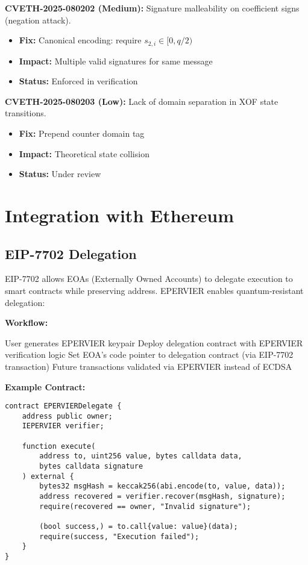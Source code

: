 \documentclass[11pt,a4paper]{article}
\begin{document}
\textbf{CVETH-2025-080202 (Medium):} Signature malleability on coefficient signs (negation attack).
\begin{itemize}
    \item \textbf{Fix:} Canonical encoding: require $s_{2,i} \in [0, q/2)$
    \item \textbf{Impact:} Multiple valid signatures for same message
    \item \textbf{Status:} Enforced in verification
\end{itemize}

\textbf{CVETH-2025-080203 (Low):} Lack of domain separation in XOF state transitions.
\begin{itemize}
    \item \textbf{Fix:} Prepend counter domain tag
    \item \textbf{Impact:} Theoretical state collision
    \item \textbf{Status:} Under review
\end{itemize}

\section{Integration with Ethereum}

\subsection{EIP-7702 Delegation}

EIP-7702 allows EOAs (Externally Owned Accounts) to delegate execution to smart contracts while preserving address. EPERVIER enables quantum-resistant delegation:

\textbf{Workflow:}
\begin{algorithmic}[1]
\STATE User generates EPERVIER keypair
\STATE Deploy delegation contract with EPERVIER verification logic
\STATE Set EOA's code pointer to delegation contract (via EIP-7702 transaction)
\STATE Future transactions validated via EPERVIER instead of ECDSA
\end{algorithmic}

\textbf{Example Contract:}
\begin{lstlisting}[language=Solidity]
contract EPERVIERDelegate {
    address public owner;
    IEPERVIER verifier;

    function execute(
        address to, uint256 value, bytes calldata data,
        bytes calldata signature
    ) external {
        bytes32 msgHash = keccak256(abi.encode(to, value, data));
        address recovered = verifier.recover(msgHash, signature);
        require(recovered == owner, "Invalid signature");

        (bool success,) = to.call{value: value}(data);
        require(success, "Execution failed");
    }
}
\end{lstlisting}
\end{document}
